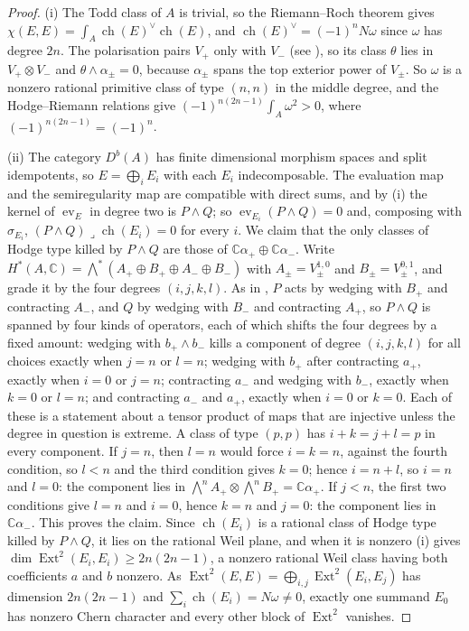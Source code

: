 \documentclass[11pt,reqno]{amsart}
\theoremstyle{plain}
\theoremstyle{definition}
\theoremstyle{remark}
\newcommand{\CC}{\mathbb{C}}
\DeclareMathOperator{\ch}{ch}
\DeclareMathOperator{\Ext}{Ext}
\begin{document}
\begin{proof}
(i) The Todd class of $A$ is trivial, so the Riemann--Roch theorem gives
$\chi(E,E)=\int_{A}\ch(E)^{\vee}\ch(E)$, and $\ch(E)^{\vee}=(-1)^{n}N\omega$
since $\omega$ has degree $2n$. The polarisation pairs $V_{+}$ only with
$V_{-}$ (see \cite[Figure~9]{paperI}), so its class $\theta$ lies in
$V_{+}\otimes V_{-}$ and $\theta\wedge\alpha_{\pm}=0$, because $\alpha_{\pm}$
spans the top exterior power of $V_{\pm}$. So $\omega$ is a nonzero rational
primitive class of type $(n,n)$ in the middle degree, and the Hodge--Riemann
relations give $(-1)^{n(2n-1)}\int_{A}\omega^{2}>0$, where
$(-1)^{n(2n-1)}=(-1)^{n}$.

(ii) The category $D^{b}(A)$ has finite dimensional morphism spaces and split
idempotents, so $E=\bigoplus_{i}E_{i}$ with each $E_{i}$ indecomposable. The
evaluation map and the semiregularity map are compatible with direct sums,
and by (i) the kernel of $\operatorname{ev}_{E}$ in
degree two is $P\wedge Q$; so $\operatorname{ev}_{E_{i}}(P\wedge Q)=0$ and,
composing with $\sigma_{E_{i}}$, $(P\wedge Q)\lrcorner\ch(E_{i})=0$ for every
$i$. We claim that the only classes of Hodge type killed by $P\wedge Q$ are
those of $\CC\alpha_{+}\oplus\CC\alpha_{-}$. Write
$H^{*}(A,\CC)=\bigwedge^{*}(A_{+}\oplus B_{+}\oplus A_{-}\oplus B_{-})$ with
$A_{\pm}=V_{\pm}^{1,0}$ and $B_{\pm}=V_{\pm}^{0,1}$, and grade it by the four
degrees $(i,j,k,l)$. As in , $P$ acts by wedging with $B_{+}$
and contracting $A_{-}$, and $Q$ by wedging with $B_{-}$ and contracting
$A_{+}$, so $P\wedge Q$ is spanned by four kinds of operators, each of which
shifts the four degrees by a fixed amount: wedging with $b_{+}\wedge b_{-}$
kills a component of degree $(i,j,k,l)$ for all choices exactly when $j=n$ or
$l=n$; wedging with $b_{+}$ after contracting $a_{+}$, exactly when $i=0$ or
$j=n$; contracting $a_{-}$ and wedging with $b_{-}$, exactly when $k=0$ or
$l=n$; and contracting $a_{-}$ and $a_{+}$, exactly when $i=0$ or $k=0$. Each
of these is a statement about a tensor product of maps that are injective
unless the degree in question is extreme. A class of type $(p,p)$ has
$i+k=j+l=p$ in every component. If $j=n$, then $l=n$ would force $i=k=n$,
against the fourth condition, so $l<n$ and the third condition gives $k=0$;
hence $i=n+l$, so $i=n$ and $l=0$: the component lies in
$\bigwedge^{n}A_{+}\otimes\bigwedge^{n}B_{+}=\CC\alpha_{+}$. If $j<n$, the
first two conditions give $l=n$ and $i=0$, hence $k=n$ and $j=0$: the
component lies in $\CC\alpha_{-}$. This proves the claim. Since $\ch(E_{i})$ is a rational class of
Hodge type killed by $P\wedge Q$, it lies on the rational Weil plane, and
when it is nonzero (i) gives
$\dim\Ext^{2}(E_{i},E_{i})\ge2n(2n-1)$, a nonzero rational Weil class having
both coefficients $a$ and $b$ nonzero. As
$\Ext^{2}(E,E)=\bigoplus_{i,j}\Ext^{2}(E_{i},E_{j})$ has dimension
$2n(2n-1)$ and $\sum_{i}\ch(E_{i})=N\omega\ne0$, exactly one summand $E_{0}$
has nonzero Chern character and every other block of $\Ext^{2}$ vanishes.


\end{proof}
\end{document}
